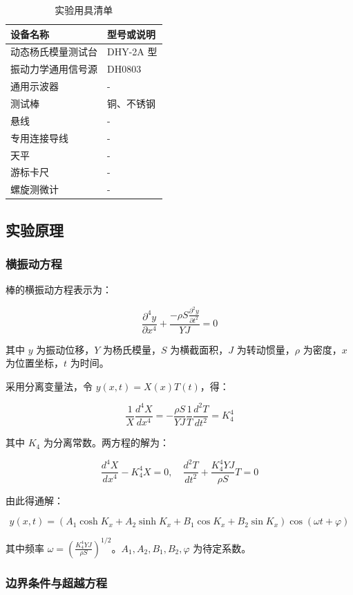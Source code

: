 \documentclass[zihao=5, UTF8]{article}
\theoremstyle{MyLineTheoremStyle} %
\theoremstyle{MyBlockTheoremStyle} %
\theoremstyle{MySubsubsectionStyle} %
\begin{document}
\begin{table}[h!]
\centering
\caption{实验用具清单}
\begin{tabular}{|l|l|}
\hline
\textbf{设备名称} & \textbf{型号或说明} \\ \hline
动态杨氏模量测试台 & DHY-2A 型 \\ \hline
振动力学通用信号源 & DH0803 \\ \hline
通用示波器 & - \\ \hline
测试棒 & 铜、不锈钢 \\ \hline
悬线 & - \\ \hline
专用连接导线 & - \\ \hline
天平 & - \\ \hline
游标卡尺 & - \\ \hline
螺旋测微计 & - \\ \hline
\end{tabular}
\end{table}

\subsection{实验原理}

\subsubsection*{横振动方程}
棒的横振动方程表示为：

\[
\frac{\partial^4 y}{\partial x^4} + \frac{-\rho S \frac{\partial^2 y}{\partial t^2}}{YJ} = 0
\]

其中 \(y\) 为振动位移，\(Y\) 为杨氏模量，\(S\) 为横截面积，\(J\) 为转动惯量，\(\rho\) 为密度，\(x\) 为位置坐标，\(t\) 为时间。

采用分离变量法，令 \(y(x, t) = X(x)T(t)\)，得：

\[
\frac{1}{X} \frac{d^4 X}{dx^4} = -\frac{\rho S}{YJ} \frac{1}{T} \frac{d^2 T}{dt^2} = K_4^4
\]

其中 \(K_4\) 为分离常数。两方程的解为：

\[
\frac{d^4 X}{dx^4} - K_4^4 X = 0, \quad \frac{d^2 T}{dt^2} + \frac{K_4^4 YJ}{\rho S} T = 0
\]

由此得通解：

\[
y(x, t) = (A_1 \cosh K_x + A_2 \sinh K_x + B_1 \cos K_x + B_2 \sin K_x) \cos (\omega t + \varphi)
\]

其中频率 \(\omega = \left( \frac{K_4^4 YJ}{\rho S} \right)^{1/2}\)。\(A_1, A_2, B_1, B_2, \varphi\) 为待定系数。

\subsubsection*{边界条件与超越方程}
\end{document}
